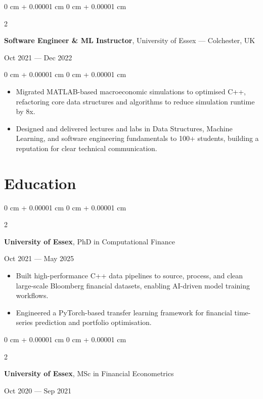 \documentclass[6pt, letterpaper]{article}
\newenvironment{highlights}{
    \begin{itemize}[
        topsep=0.03 cm,
        parsep=0.03 cm,
        partopsep=0pt,
        itemsep=0pt,
        leftmargin=0 cm + 10pt
    ]
}{
    \end{itemize}
} %
\newenvironment{onecolentry}{
    \begin{adjustwidth}{
        0 cm + 0.00001 cm
    }{
        0 cm + 0.00001 cm
    }
}{
    \end{adjustwidth}
} %
\newenvironment{twocolentry}[2][]{
    \onecolentry
    \def\secondColumn{#2}
    \setcolumnwidth{\fill, 4.5 cm}
    \begin{paracol}{2}
}{
    \switchcolumn \raggedleft \secondColumn
    \end{paracol}
    \endonecolentry
} %
\begin{document}
        \begin{twocolentry}{Oct 2021 --- Dec 2022}
        \textbf{Software Engineer \& ML Instructor}, University of Essex --- Colchester, UK
        \end{twocolentry}

        \begin{onecolentry}
        \begin{highlights}

            \item Migrated MATLAB-based macroeconomic simulations to optimised C++, refactoring core data structures and algorithms to reduce simulation runtime by 8x.
            \item Designed and delivered lectures and labs in Data Structures, Machine Learning, and software engineering fundamentals to 100+ students, building a reputation for clear technical communication.

        \end{highlights}
        \end{onecolentry}

    \section{Education}

            \begin{twocolentry}{
                Oct 2021 --- May 2025
            }
            \textbf{University of Essex}, PhD in Computational Finance
            \end{twocolentry}

            \begin{highlights}

                \item Built high-performance C++ data pipelines to source, process, and clean large-scale Bloomberg financial datasets, enabling AI-driven model training workflows.
                \item Engineered a PyTorch-based transfer learning framework for financial time-series prediction and portfolio optimisation.

            \end{highlights}

            \begin{twocolentry}{
                Oct 2020 --- Sep 2021
            }
            \textbf{University of Essex}, MSc in Financial Econometrics
            \end{twocolentry}
\end{document}

